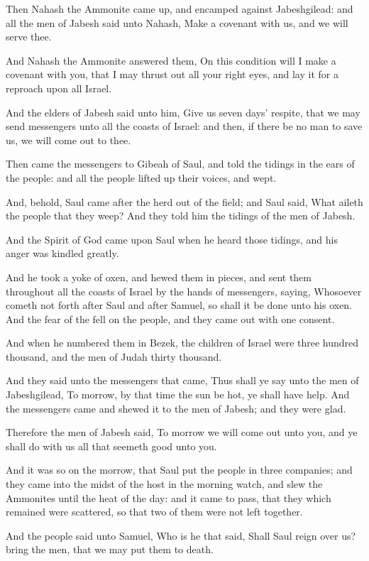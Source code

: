 \Chapter
\Verse Then Nahash the Ammonite came up, and encamped against Jabeshgilead: and all the men of Jabesh said unto Nahash, Make a covenant with us, and we will serve thee.

\Verse And Nahash the Ammonite answered them, On this condition will I make a covenant with you, that I may thrust out all your right eyes, and lay it for a reproach upon all Israel.

\Verse And the elders of Jabesh said unto him, Give us seven days' respite, that we may send messengers unto all the coasts of Israel: and then, if there be no man to save us, we will come out to thee.

\Verse Then came the messengers to Gibeah of Saul, and told the tidings in the ears of the people: and all the people lifted up their voices, and wept.

\Verse And, behold, Saul came after the herd out of the field; and Saul said, What aileth the people that they weep? And they told him the tidings of the men of Jabesh.

\Verse And the Spirit of God came upon Saul when he heard those tidings, and his anger was kindled greatly.

\Verse And he took a yoke of oxen, and hewed them in pieces, and sent them throughout all the coasts of Israel by the hands of messengers, saying, Whosoever cometh not forth after Saul and after Samuel, so shall it be done unto his oxen. And the fear of the \LORD fell on the people, and they came out with one consent.

\Verse And when he numbered them in Bezek, the children of Israel were three hundred thousand, and the men of Judah thirty thousand.

\Verse And they said unto the messengers that came, Thus shall ye say unto the men of Jabeshgilead, To morrow, by that time the sun be hot, ye shall have help. And the messengers came and shewed it to the men of Jabesh; and they were glad.

\Verse Therefore the men of Jabesh said, To morrow we will come out unto you, and ye shall do with us all that seemeth good unto you.

\Verse And it was so on the morrow, that Saul put the people in three companies; and they came into the midst of the host in the morning watch, and slew the Ammonites until the heat of the day: and it came to pass, that they which remained were scattered, so that two of them were not left together.

\Verse And the people said unto Samuel, Who is he that said, Shall Saul reign over us? bring the men, that we may put them to death.

